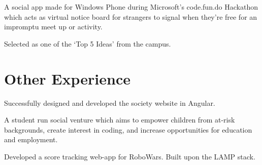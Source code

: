 \documentclass[a4paper]{resume}
\begin{document}
\begin{minipage}[t]{0.66\textwidth}


\begin{tightitemize}
\item A social app made for Windows Phone during Microsoft’s code.fun.do Hackathon which acts as virtual notice board for strangers to signal when they’re free for an impromptu meet up or activity.
\item Selected as one of the ‘Top 5 Ideas’ from the campus.
\end{tightitemize}

\sectionspace %


\section{Other Experience}

Successfully designed and developed the society website in Angular.

\sectionspace %

A student run social venture which aims to empower children from at-risk backgrounds, create interest in coding, and increase opportunities for education and employment.

\sectionspace %


\sectionspace %

Developed a score tracking web-app for RoboWars. Built upon the LAMP stack.

\sectionspace %


\sectionspace %




\end{minipage} %
\end{document}
